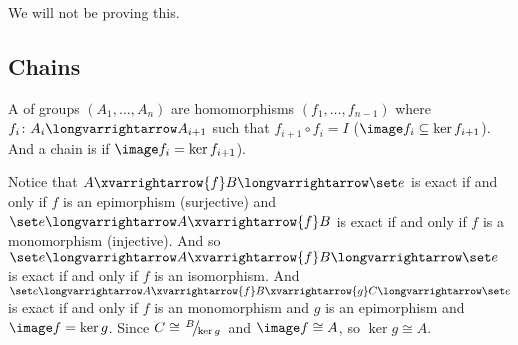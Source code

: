 \documentclass[10pt]{article}
\def\slfrac#1#2{\left.{}^{#1}\mkern-4mu\middle/\mkern-3mu{}_{#2}\right.}
\begin{document}
We will not be proving this.

\subsection{Chains}

\begin{defn*}

    A  of groups $(A_1,\dots,A_n)$ are homomorphisms $(f_1,\dots,f_{n-1})$ where $f_i\colon A_i\longvarrightarrow A_{i+1}$ such that $f_{i+1}\circ f_i=I$ ($\image f_i\subseteq\ker f_{i+1}$).
    And a chain is  if $\image f_i=\ker f_{i+1}$).

\end{defn*}

Notice that $A\xvarrightarrow{f}B\longvarrightarrow\set e$ is exact if and only if $f$ is an epimorphism (surjective) and $\set e\longvarrightarrow A\xvarrightarrow{f}B$ is exact if and only if $f$ is a
monomorphism (injective).
And so $\set e\longvarrightarrow A\xvarrightarrow{f}B\longvarrightarrow\set e$ is exact if and only if $f$ is an isomorphism.
And $\set e\longvarrightarrow A\xvarrightarrow{f}B\xvarrightarrow{g}C\longvarrightarrow\set e$ is exact if and only if $f$ is an monomorphism and $g$ is an epimorphism and $\image f=\ker g$.
Since $C\cong\slfrac{B}{\ker g}$ and $\image f\cong A$, so $\ker g\cong A$.
\end{document}
